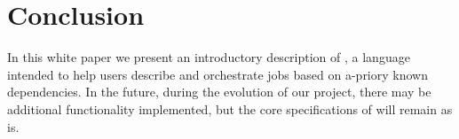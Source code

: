 \section{Conclusion}
\label{sect:conc}
In this white paper we present an introductory description of \lang{}, a
language intended to help users describe and orchestrate jobs based on a-priory
known dependencies. In the future, during the evolution of our project, there
may be additional functionality implemented, but the core specifications of
\lang{} will remain as is.
